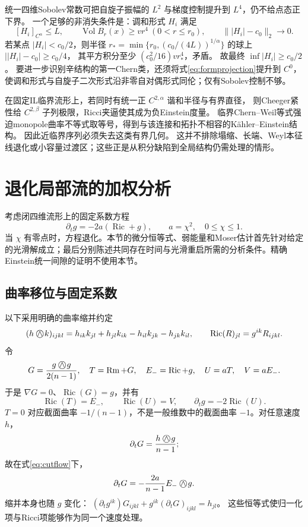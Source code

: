 \documentclass[UTF8,a4paper,11pt,fontset=fandol]{ctexart}
\numberwithin{equation}{section}
\theoremstyle{definition}
\newcommand{\Ric}{\operatorname{Ric}}
\newcommand{\Rm}{\operatorname{Rm}}
\newcommand{\owedge}{\mathbin{\bigcirc\mkern-15mu\wedge}}
\newcommand{\Vol}{\operatorname{Vol}}
\begin{document}
统一四维Sobolev常数可把自旋子振幅的 $L^2$ 与梯度控制提升到 $L^4$，仍不给点态正下界。
一个足够的非消失条件是：调和形式 $H_i$ 满足
\[
[H_i]_{C^\alpha}\le L,\qquad
\Vol B_r(x)\ge vr^4\ (0<r\le r_0),\qquad
\||H_i|-c_0\|_2\to0.
\]
若某点 $|H_i|<c_0/2$，则半径
$r_*=\min\{r_0,(c_0/(4L))^{1/\alpha}\}$ 的球上
$\bigl||H_i|-c_0\bigr|\ge c_0/4$，
其平方积分至少 $(c_0^2/16)vr_*^4$，矛盾。
故最终 $\inf|H_i|\ge c_0/2$。
要进一步识别辛结构的第一Chern类，还须将式\eqref{eq:formprojection}提升到 $C^0$，使调和形式与自旋子二次形式沿非零自对偶形式同伦；仅有Sobolev控制不够。

在固定IL临界流形上，若同时有统一正 $C^{2,\alpha}$ 谐和半径与有界直径，
则Cheeger紧性给 $C^{2,\beta}$ 子列极限，Ricci夹逼使其成为负Einstein度量。
临界Chern--Weil等式强迫monopole曲率不等式取等号，得到与该连接和拓扑不相容的K\"ahler--Einstein结构。
因此近临界序列必须失去这类有界几何。
这并不排除塌缩、长端、Weyl本征线退化或小容量过渡区；这些正是从积分缺陷到全局结构仍需处理的情形。


\appendix
\section{退化局部流的加权分析}\label{app:flow}
考虑闭四维流形上的固定系数方程
\begin{equation}\label{eq:cutflow}
\partial_tg=-2a(\Ric+g),\qquad a=\chi^2,\quad 0\le\chi\le1.
\end{equation}
当 $\chi$ 有零点时，方程退化。本节的微分恒等式、弱能量和Moser估计首先针对给定的光滑解成立；最后分别陈述共同存在时间与光滑重启所需的分析条件。精确Einstein统一间隙的证明不使用本节。

\subsection{曲率移位与固定系数}
以下采用明确的曲率缩并约定
\[
(h\owedge k)_{ijkl}=h_{ik}k_{jl}+h_{jl}k_{ik}-h_{il}k_{jk}-h_{jk}k_{il},
\qquad \Ric(R)_{jl}=g^{ik}R_{ijkl}.
\]
令
\[
G=\frac{g\owedge g}{2(n-1)},\quad T=\Rm+G,\quad
E_-=\Ric+g,\quad U=aT,\quad V=aE_-.
\]
于是 $\nabla G=0$、$\Ric(G)=g$，并有
\begin{equation}\label{eq:shift-contract}
\Ric(T)=E_-,\qquad \Ric(U)=V,\qquad \partial_tg=-2\Ric(U).
\end{equation}
$T=0$ 对应截面曲率 $-1/(n-1)$，不是一般维数中的截面曲率 $-1$。对任意速度 $h$，
\[
\partial_tG=\frac{h\owedge g}{n-1};
\]
故在式\eqref{eq:cutflow}下，
\[
\partial_tG=-\frac{2a}{n-1}E_-\owedge g.
\]
缩并本身也随 $g$ 变化：
$(\partial_tg^{ik})G_{ijkl}+g^{ik}(\partial_tG)_{ijkl}=h_{jl}$。
这些恒等式使归一化项与Ricci项能够作为同一个速度处理。
\end{document}
